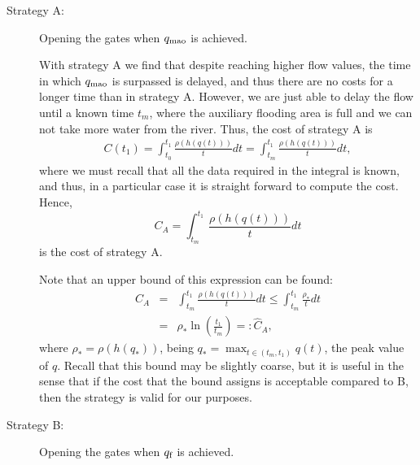 \begin{description}
\item[Strategy A:] Opening the gates when $q_{\mbox{\scriptsize mao}}$ is achieved.

\noindent With strategy A we find that despite reaching higher flow values, the time in which $q_{\mbox{\scriptsize mao}}$ is surpassed is delayed, and thus there are no costs  for a longer time than in strategy A. However, we are just able to delay the flow until a known time $t_m$, where the auxiliary flooding area is full and we can not take more water from the river. Thus, the cost of strategy A is
\begin{eqnarray*}
C(t_1)=\int_{t_0}^{t_1}\frac{\rho(h(q(t)))}{t}dt=\int_{t_m}^{t_1}\frac{\rho(h(q(t)))}{t}dt,
\end{eqnarray*}
where we must recall that all the data required in the integral is known, and thus, in a particular case it is straight forward to compute the cost.
\newline
Hence,
\begin{equation}
C_A=\int_{t_m}^{t_1}\frac{\rho(h(q(t)))}{t}dt
\label{costA}
\end{equation}
is the cost of strategy A.

Note that an upper bound of this expression can be found:
\begin{eqnarray*}
C_A&=&\int_{t_m}^{t_1}\frac{\rho(h(q(t)))}{t}dt 
\leq\int_{t_m}^{t_1}\frac{\rho_*}{t}dt \\
&=& \rho_* \ln\left(\frac{t_1}{t_m}\right) =: \hat{C}_A,
\end{eqnarray*}
where $\rho_*=\rho(h(q_*))$, being $q_*=\max_{t\in(t_m,t_1)}q(t)$, the peak value of $q$. Recall that this bound may be slightly coarse, but it is useful in the sense that if the cost that the bound assigns is acceptable compared to B, then the strategy is valid for our purposes.

\item[Strategy B:] Opening the gates when $q_{\mbox{\scriptsize f}}$ is achieved.


\end{description}
